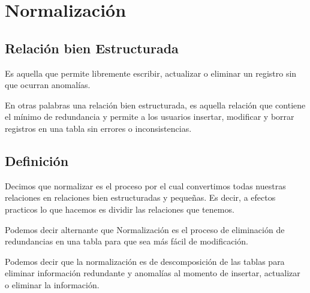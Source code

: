 \documentclass[12pt, fleqn]{report}                             %
\begin{document}
        \clearpage
        \section{Normalización}


            \subsection{Relación bien Estructurada}

                Es aquella que permite libremente escribir, actualizar o eliminar un registro
                sin que ocurran anomalías.

                En otras palabras una relación bien estructurada, es aquella relación que
                contiene el mínimo de redundancia y permite a los usuarios insertar, modificar
                y borrar registros en una tabla sin errores o inconsistencias.


            \subsection{Definición}

                Decimos que normalizar es el proceso por el cual convertimos todas nuestras relaciones
                en relaciones bien estructuradas y pequeñas.
                Es decir, a efectos practicos lo que hacemos es dividir las relaciones que tenemos.

                Podemos decir alternante que Normalización es el proceso de eliminación de
                redundancias en una tabla para que sea más fácil de modificación.

                Podemos decir que la normalización es de descomposición de las tablas para eliminar
                información redundante y anomalías al momento de insertar, actualizar o eliminar la
                información.


\end{document}
